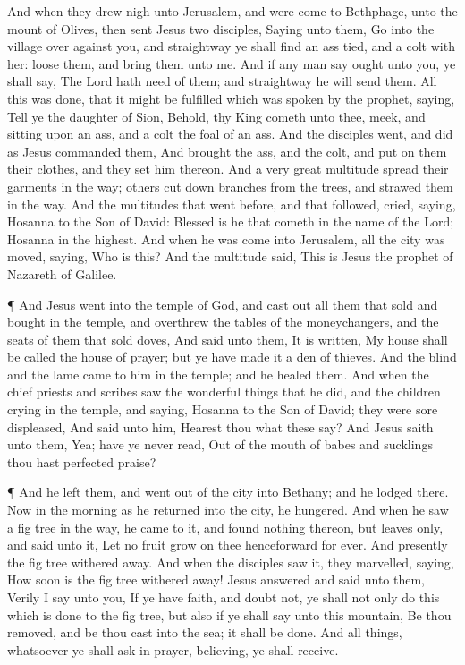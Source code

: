  And when they drew nigh unto Jerusalem, and were come to
Bethphage, unto the mount of Olives, then sent Jesus two disciples,
 Saying unto them, Go into the village over against you, and
straightway ye shall find an ass tied, and a colt with her: loose them,
and bring them unto me.  And if any man say ought unto you,
ye shall say, The Lord hath need of them; and straightway he will send
them.  All this was done, that it might be fulfilled which
was spoken by the prophet, saying,  Tell ye the daughter of
Sion, Behold, thy King cometh unto thee, meek, and sitting upon an ass,
and a colt the foal of an ass.  And the disciples went, and
did as Jesus commanded them,  And brought the ass, and the
colt, and put on them their clothes, and they set him thereon.
 And a very great multitude spread their garments in the
way; others cut down branches from the trees, and strawed them in the
way.  And the multitudes that went before, and that
followed, cried, saying, Hosanna to the Son of David: Blessed is he that
cometh in the name of the Lord; Hosanna in the highest. 
And when he was come into Jerusalem, all the city was moved, saying, Who
is this?  And the multitude said, This is Jesus the prophet
of Nazareth of Galilee.

 ¶ And Jesus went into the temple of God, and cast out all
them that sold and bought in the temple, and overthrew the tables of the
moneychangers, and the seats of them that sold doves,  And
said unto them, It is written, My house shall be called the house of
prayer; but ye have made it a den of thieves.  And the
blind and the lame came to him in the temple; and he healed them.
 And when the chief priests and scribes saw the wonderful
things that he did, and the children crying in the temple, and saying,
Hosanna to the Son of David; they were sore displeased, 
And said unto him, Hearest thou what these say? And Jesus saith unto
them, Yea; have ye never read, Out of the mouth of babes and sucklings
thou hast perfected praise?

 ¶ And he left them, and went out of the city into Bethany;
and he lodged there.  Now in the morning as he returned
into the city, he hungered.  And when he saw a fig tree in
the way, he came to it, and found nothing thereon, but leaves only, and
said unto it, Let no fruit grow on thee henceforward for ever. And
presently the fig tree withered away.  And when the
disciples saw it, they marvelled, saying, How soon is the fig tree
withered away!  Jesus answered and said unto them, Verily I
say unto you, If ye have faith, and doubt not, ye shall not only do this
which is done to the fig tree, but also if ye shall say unto this
mountain, Be thou removed, and be thou cast into the sea; it shall be
done.  And all things, whatsoever ye shall ask in prayer,
believing, ye shall receive.

